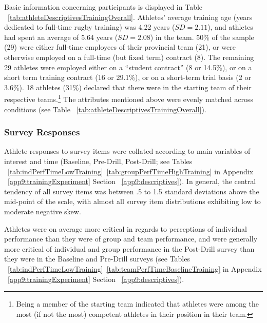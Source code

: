 

Basic information concerning participants is displayed in Table ~\ref{tab:athleteDescriptivesTrainingOverall}.  Athletes' average training age (years dedicated to full-time rugby training) was 4.22 years ($SD = 2.11$), and athletes had spent an average of 5.64 years ($SD = 2.08$) in the team.  50\% of the sample (29) were either full-time employees of their provincial team (21), or were otherwise employed on a full-time (but fixed term) contract (8).  The remaining 29 athletes were employed either on a ``student contract'' (8 or 14.5\%), or on a short term training contract (16 or 29.1\%), or on a short-term trial basis (2 or 3.6\%).  18 athletes (31\%) declared that there were in the starting team of their respective teams.\footnote{Being a member of the starting team indicated that athletes were among the most (if not the most) competent athletes in their position in their team.}
The attributes mentioned above were evenly matched across conditions (see Table ~\ref{tab:athleteDescriptivesTrainingOverall}).


\subsubsection{Survey Responses\label{sec:surveyResponses}}
Athlete responses to survey items were collated according to main variables of interest and time (Baseline, Pre-Drill, Post-Drill; see Tables ~\ref{tab:indPerfTimeLowTraining}\nobreakdash~\ref{tab:groupPerfTimeHighTraining} in Appendix ~\ref{app9:trainingExperiment} Section ~\ref{app9:descriptives}).  In general, the central tendency of all survey items was between .5 to 1.5 standard deviations above the mid-point of the scale, with almost all survey item distributions exhibiting low to moderate negative skew.

Athletes were on average more critical in regards to perceptions of individual performance than they were of group and team performance, and were generally more critical of individual and group performance in the Post-Drill survey than they were in the Baseline and Pre-Drill surveys (see Tables ~\ref{tab:indPerfTimeLowTraining}\nobreakdash~\ref{tab:teamPerfTimeBaselineTraining} in Appendix ~\ref{app9:trainingExperiment} Section ~\ref{app9:descriptives}).

